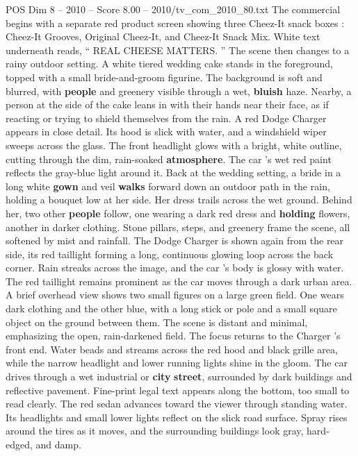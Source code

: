 \begin{textsample}{POS Dim 8 – 2010 – Score 8.00 – 2010/tv\_com\_2010\_80.txt}  \label{ex:f8_pos_024}
The commercial begins with a separate red product screen showing three Cheez-It snack boxes : Cheez-It Grooves, Original Cheez-It, and Cheez-It Snack Mix.
White text underneath reads, “ REAL CHEESE MATTERS. ” The scene then changes to a rainy outdoor setting.
A white tiered wedding cake stands in the foreground, topped with a small bride-and-groom figurine.
The background is soft and blurred, with \textbf{people} and greenery visible through a wet, \textbf{bluish} haze.
Nearby, a person at the side of the cake leans in with their hands near their face, as if reacting or trying to shield themselves from the rain.
A red Dodge Charger appears in close detail.
Its hood is slick with water, and a windshield wiper sweeps across the glass.
The front headlight glows with a bright, white outline, cutting through the dim, rain-soaked \textbf{atmosphere}.
The car ’s wet red paint reflects the gray-blue light around it.
Back at the wedding setting, a bride in a long white \textbf{gown} and veil \textbf{walks} forward down an outdoor path in the rain, holding a bouquet low at her side.
Her dress trails across the wet ground.
Behind her, two other \textbf{people} follow, one wearing a dark red dress and \textbf{holding} flowers, another in darker clothing.
Stone pillars, steps, and greenery frame the scene, all softened by mist and rainfall.
The Dodge Charger is shown again from the rear side, its red taillight forming a long, continuous glowing loop across the back corner.
Rain streaks across the image, and the car ’s body is glossy with water.
The red taillight remains prominent as the car moves through a dark urban area.
A brief overhead view shows two small figures on a large green field.
One wears dark clothing and the other blue, with a long stick or pole and a small square object on the ground between them.
The scene is distant and minimal, emphasizing the open, rain-darkened field.
The focus returns to the Charger ’s front end.
Water beads and streams across the red hood and black grille area, while the narrow headlight and lower running lights shine in the gloom.
The car drives through a wet industrial or \textbf{city} \textbf{street}, surrounded by dark buildings and reflective pavement.
Fine-print legal text appears along the bottom, too small to read clearly.
The red sedan advances toward the viewer through standing water.
Its headlights and small lower lights reflect on the slick road surface.
Spray rises around the tires as it moves, and the surrounding buildings look gray, hard-edged, and damp.

\end{textsample}
